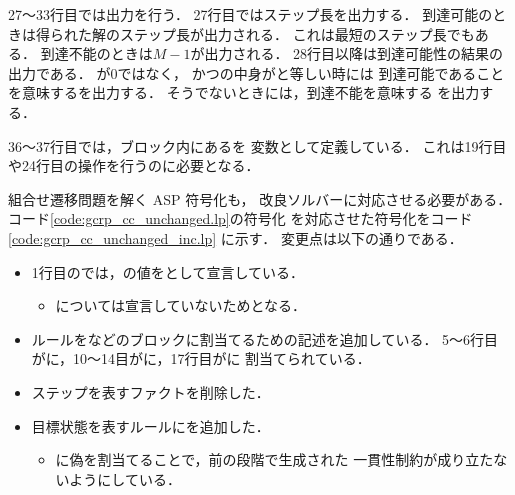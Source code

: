 27～33行目では出力を行う．
27行目ではステップ長を出力する．
到達可能のときは得られた解のステップ長が出力される．
これは最短のステップ長でもある．
到達不能のときは$M-1$が出力される．
28行目以降は到達可能性の結果の出力である．
が$0$ではなく，
かつの中身がと等しい時には
到達可能であることを意味するを出力する．
そうでないときには，到達不能を意味する
を出力する．

36～37行目では，ブロック内にあるを
変数として定義している．
これは19行目や24行目の操作を行うのに必要となる．



組合せ遷移問題を解く ASP 符号化も，
改良ソルバーに対応させる必要がある．
コード\ref{code:gcrp_cc_unchanged.lp}の符号化
を対応させた符号化をコード\ref{code:gcrp_cc_unchanged_inc.lp}
に示す．
変更点は以下の通りである．
\begin{itemize}
  \item 1行目のでは，の値をとして宣言している．
  \begin{itemize}
    \item {}については宣言していないためとなる．
  \end{itemize}

  \item ルールをなどのブロックに割当てるための記述を追加している．
  5～6行目がに，10～14目がに，17行目がに
  割当てられている．

  \item ステップを表すファクトを削除した．
  \item 目標状態を表すルールにを追加した．
  \begin{itemize}
    \item {}に偽を割当てることで，前の段階で生成された
    一貫性制約が成り立たないようにしている．
  \end{itemize}
\end{itemize}

